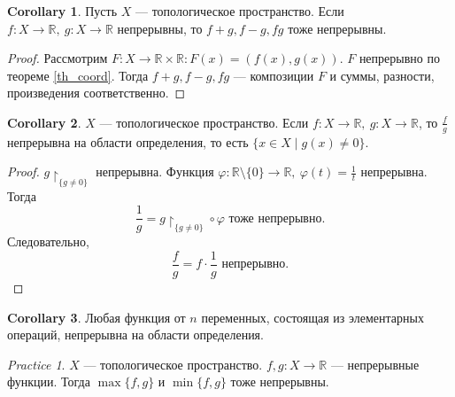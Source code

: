 \documentclass[11pt]{book}
\newcommand{\R}{\mathbb{R}}
\theoremstyle{definition}
\theoremstyle{plain}
\theoremstyle{plain}
\theoremstyle{definition}
\newtheorem*{cor}{Corollary}
\theoremstyle{remark}
\newtheorem*{prac}{Practice}
\begin{document}
\begin{cor}
    Пусть $ X$ --- топологическое пространство. Если $ f: X \to  \R, ~ g : X \to  \R$ непрерывны, то $ f+g, f-g, fg$ тоже непрерывны.
\end{cor}
\begin{proof}
    Рассмотрим $ F: X \to \R \times \R: F(x) = (f(x), g(x))$. $ F$ непрерывно по теореме \ref{th_coord}.
    Тогда $ f+g, f-g, fg$ --- композиции  $ F$ и суммы, разности, произведения соответственно.
\end{proof}
\begin{cor}
    $ X$ --- топологическое пространство.  Если $ f: X \to  \R, ~ g: X \to \R$, то $ \frac{f}{g}$ непрерывна на области определения, то есть $ \{x \in X\mid g(x) \ne 0\}$.
\end{cor}
\begin{proof}
    $ g\!\upharpoonright_{\{g \ne  0\}}$ непрерывна.
    Функция $ \varphi : \R\setminus \{0\} \to  \R, ~ \varphi (t)  = \frac{1}{t}$ непрерывна.
    Тогда
    \[
    \frac{1}{g} = g\!\upharpoonright_{\{g\ne 0\}} \circ \varphi  \text{ тоже непрерывно}
    .\] 
    Следовательно,
    \[
    \frac{f}{g} = f \cdot \frac{1}{g} \text{ непрерывно}
    .\] 
\end{proof}
\begin{cor}
    Любая функция от $ n$ переменных, состоящая из элементарных операций, непрерывна на области определения.
\end{cor}
\begin{prac}
    $ X$ --- топологическое пространство. $ f, g: X \to  \R$ --- непрерывные функции. Тогда $ \max \{f, g\}$ и $ \min \{f, g\}$ тоже непрерывны.
\end{prac}
\end{document}
